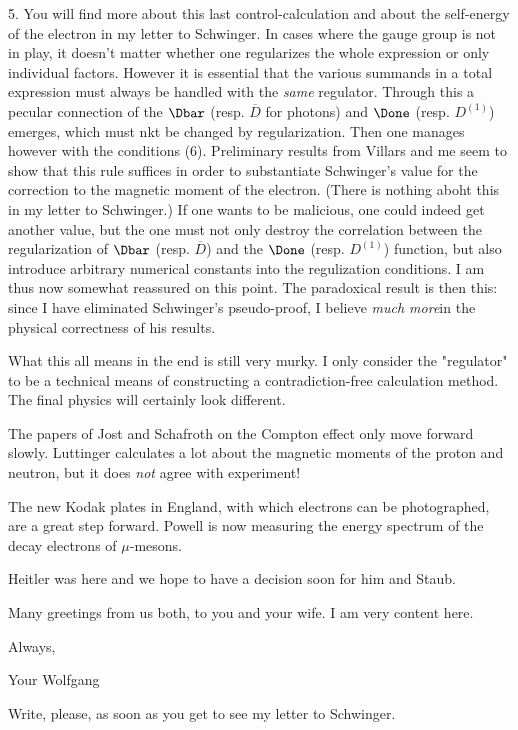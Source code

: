 \documentclass{article}
\begin{document}
5. You will find more about this last control-calculation and about the self-energy of the electron in my letter to Schwinger. In cases where the gauge group is not in play, it doesn't matter whether one regularizes the whole expression or only individual factors. However it is essential that the various summands in a total expression must always be handled with the \textit{same} regulator. Through this a pecular connection of the $\Dbar$ (resp. $\overline{D}$ for photons) and $\Done$ (resp. $D^{(1)}$) emerges, which must nkt be changed by regularization. Then one manages however with the conditions (6). Preliminary results from Villars and me seem to show that this rule suffices in order to substantiate Schwinger's value for the correction to the magnetic moment of the electron. (There is nothing aboht this in my letter to Schwinger.) If one wants to be malicious, one could indeed get another value, but the one must not only destroy the correlation between the regularization of $\Dbar$ (resp. $\overline{D}$) and the $\Done$ (resp. $D^{(1)}$) function, but also introduce arbitrary numerical constants into the regulization conditions. I am thus now somewhat reassured on this point. The paradoxical result is then this: since I have eliminated Schwinger's pseudo-proof, I believe \textit{much more}in the physical correctness of his results.

What this all means in the end is still very murky. I only consider the "regulator" to be a technical means of constructing a contradiction-free calculation method. The final physics will certainly look different.

The papers of Jost and Schafroth on the Compton effect only move forward slowly. Luttinger calculates a lot about the magnetic moments of the proton and neutron, but it does \textit{not} agree with experiment!

The new Kodak plates in England, with which electrons can be photographed, are a great step forward. Powell is now measuring the energy spectrum of the decay electrons of $\mu$-mesons.

Heitler was here  and we hope to have a decision soon for him and Staub.

Many greetings from us both, to you and your wife. I am very content here.

Always,

Your Wolfgang

Write, please, as soon as you get to see my letter to Schwinger.

\date{June 17, 1949}
\end{document}
